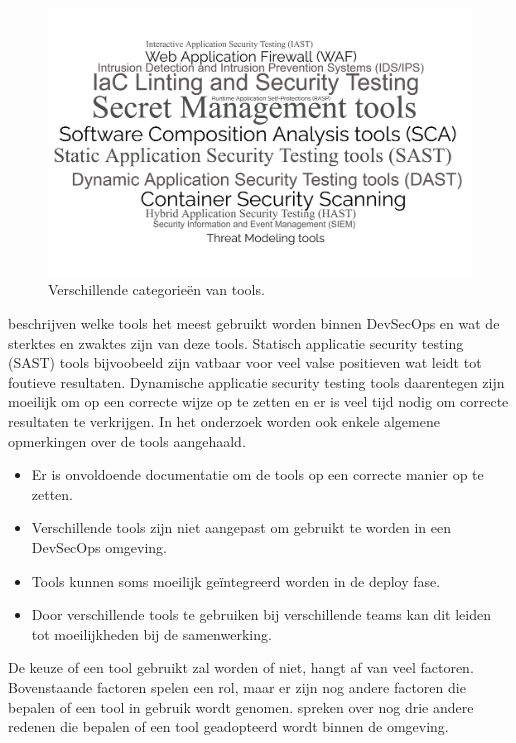 \begin{figure}[H]
  \centering
  \includegraphics[scale=0.10]{graphics/wordcloud.png}
  \caption{\label{fig:wordcloud}Verschillende categorieën van tools. \autocite{Martelleur2022}}
\end{figure}
\clearpage

\textcite{Martelleur2022} beschrijven welke tools het meest gebruikt worden binnen DevSecOps en wat de sterktes en zwaktes zijn van deze tools. Statisch applicatie security testing (SAST) tools bijvoobeeld zijn vatbaar voor veel valse positieven wat leidt tot foutieve resultaten. Dynamische applicatie security testing tools daarentegen zijn moeilijk om op een correcte wijze op te zetten en er is veel tijd nodig om correcte resultaten te verkrijgen. In het onderzoek worden ook enkele algemene opmerkingen over de tools aangehaald.


\begin{itemize}
  \item Er is onvoldoende documentatie om de tools op een correcte manier op te zetten.
  \item Verschillende tools zijn niet aangepast om gebruikt te worden in een DevSecOps omgeving.
  \item Tools kunnen soms moeilijk geïntegreerd worden in de deploy fase.
  \item Door verschillende tools te gebruiken bij verschillende teams kan dit leiden tot moeilijkheden bij de samenwerking.
\end{itemize}
  
De keuze of een tool gebruikt zal worden of niet, hangt af van veel factoren. Bovenstaande factoren spelen een rol, maar er zijn nog andere factoren die bepalen of een tool in gebruik wordt genomen. \textcite{Rajapakse2022} spreken over nog drie andere redenen die bepalen of een tool geadopteerd wordt binnen de omgeving.

